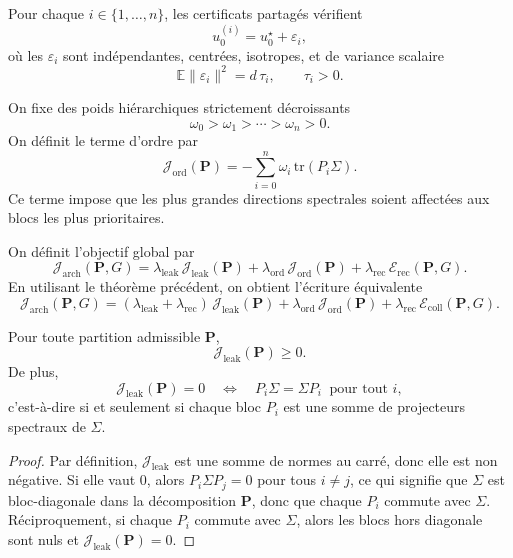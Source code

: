 \begin{assumption}
Pour chaque \(i\in\{1,\dots,n\}\), les certificats partagés vérifient
\[
u_0^{(i)}=u_0^\star+\varepsilon_i,
\]
où les \(\varepsilon_i\) sont indépendantes, centrées, isotropes, et de variance scalaire
\[
\mathbb E\|\varepsilon_i\|^2=d\,\tau_i,
\qquad \tau_i>0.
\]
\end{assumption}

\begin{definition}
On fixe des poids hiérarchiques strictement décroissants
\[
\omega_0>\omega_1>\cdots>\omega_n>0.
\]
On définit le terme d'ordre par
\[
\mathcal J_{\mathrm{ord}}(\mathbf P)
=
-\sum_{i=0}^n \omega_i\,\mathrm{tr}(P_i\Sigma).
\]
Ce terme impose que les plus grandes directions spectrales soient affectées aux blocs les plus prioritaires.
\end{definition}

\begin{definition}
On définit l'objectif global par
\[
\mathcal J_{\mathrm{arch}}(\mathbf P,G)
=
\lambda_{\mathrm{leak}}\,\mathcal J_{\mathrm{leak}}(\mathbf P)
+
\lambda_{\mathrm{ord}}\,\mathcal J_{\mathrm{ord}}(\mathbf P)
+
\lambda_{\mathrm{rec}}\,\mathcal E_{\mathrm{rec}}(\mathbf P,G).
\]
En utilisant le théorème précédent, on obtient l'écriture équivalente
\[
\mathcal J_{\mathrm{arch}}(\mathbf P,G)
=
(\lambda_{\mathrm{leak}}+\lambda_{\mathrm{rec}})\,
\mathcal J_{\mathrm{leak}}(\mathbf P)
+
\lambda_{\mathrm{ord}}\,\mathcal J_{\mathrm{ord}}(\mathbf P)
+
\lambda_{\mathrm{rec}}\,\mathcal E_{\mathrm{coll}}(\mathbf P,G).
\]
\end{definition}

\begin{lemma}
Pour toute partition admissible \(\mathbf P\),
\[
\mathcal J_{\mathrm{leak}}(\mathbf P)\ge 0.
\]
De plus,
\[
\mathcal J_{\mathrm{leak}}(\mathbf P)=0
\quad\Longleftrightarrow\quad
P_i\Sigma=\Sigma P_i
\ \text{ pour tout } i,
\]
c'est-à-dire si et seulement si chaque bloc \(P_i\) est une somme de projecteurs spectraux de \(\Sigma\).
\end{lemma}

\begin{proof}
Par définition, \(\mathcal J_{\mathrm{leak}}\) est une somme de normes au carré, donc elle est non négative.
Si elle vaut \(0\), alors \(P_i\Sigma P_j=0\) pour tous \(i\neq j\), ce qui signifie que \(\Sigma\) est bloc-diagonale dans la décomposition \(\mathbf P\), donc que chaque \(P_i\) commute avec \(\Sigma\).
Réciproquement, si chaque \(P_i\) commute avec \(\Sigma\), alors les blocs hors diagonale sont nuls et \(\mathcal J_{\mathrm{leak}}(\mathbf P)=0\).
\end{proof}

